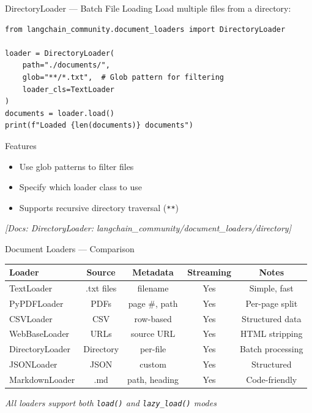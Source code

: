 \documentclass[aspectratio=169,11pt]{beamer}
\newcommand{\docref}[1]{{\scriptsize\color{docgray}[Docs: #1]}}
\begin{document}
\begin{frame}[fragile]{DirectoryLoader --- Batch File Loading}
  Load multiple files from a directory:
  \begin{lstlisting}
from langchain_community.document_loaders import DirectoryLoader

loader = DirectoryLoader(
    path="./documents/",
    glob="**/*.txt",  # Glob pattern for filtering
    loader_cls=TextLoader
)
documents = loader.load()
print(f"Loaded {len(documents)} documents")
  \end{lstlisting}

  \vspace{0.5cm}
  \begin{conceptbox}{Features}
    \begin{itemize}
    \setlength{\itemsep}{1pt}
      \item Use glob patterns to filter files
      \item Specify which loader class to use
      \item Supports recursive directory traversal (\texttt{**})
    \end{itemize}
  \end{conceptbox}

  \textit{\docref{DirectoryLoader: langchain\_community/document\_loaders/directory}}
\end{frame}

\begin{frame}{Document Loaders --- Comparison}
  \begin{center}
    \small
    \begin{tabular}{lcccc}
      \toprule
      \textbf{Loader} & \textbf{Source} & \textbf{Metadata} & \textbf{Streaming} & \textbf{Notes} \\
      \midrule
      TextLoader & .txt files & filename & Yes & Simple, fast \\
      PyPDFLoader & PDFs & page \#, path & Yes & Per-page split \\
      CSVLoader & CSV & row-based & Yes & Structured data \\
      WebBaseLoader & URLs & source URL & Yes & HTML stripping \\
      DirectoryLoader & Directory & per-file & Yes & Batch processing \\
      JSONLoader & JSON & custom & Yes & Structured \\
      MarkdownLoader & .md & path, heading & Yes & Code-friendly \\
      \bottomrule
    \end{tabular}
  \end{center}

  \vspace{1cm}
  \textit{All loaders support both \texttt{load()} and \texttt{lazy\_load()} modes}
\end{frame}
\end{document}
